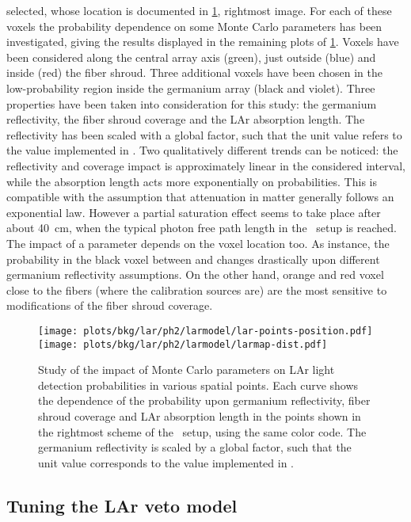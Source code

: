 selected, whose location is documented in \cref{fig:bkg:lar:ph2:larmap:dist}, rightmost
image. For each of these voxels the probability dependence on some Monte Carlo parameters
has been investigated, giving the results displayed in the remaining plots of
\cref{fig:bkg:lar:ph2:larmap:dist}. Voxels have been considered along the central array
axis (green), just outside (blue) and inside (red) the fiber shroud. Three additional
voxels have been chosen in the low-probability region inside the germanium array (black
and violet). Three properties have been taken into consideration for this study: the
germanium reflectivity, the fiber shroud coverage and the LAr absorption length. The
reflectivity has been scaled with a global factor, such that the unit value refers to the
value implemented in \mage. Two qualitatively different trends can be noticed: the
reflectivity and coverage impact is approximately linear in the considered interval, while
the absorption length acts more exponentially on probabilities. This is compatible with
the assumption that attenuation in matter generally follows an exponential law. However a
partial saturation effect seems to take place after about 40~cm, when the typical photon
free path length in the \gerda\ setup is reached. The impact of a parameter depends on the
voxel location too. As instance, the probability in the black voxel between  and
 changes drastically upon different germanium reflectivity assumptions. On the
other hand, orange and red voxel close to the fibers (where the calibration sources are)
are the most sensitive to modifications of the fiber shroud coverage.

\begin{figure}
  \centering
  \texttt{[image: plots/bkg/lar/ph2/larmodel/lar-points-position.pdf]}
  \texttt{[image: plots/bkg/lar/ph2/larmodel/larmap-dist.pdf]}
  \caption{%
    Study of the impact of Monte Carlo parameters on LAr light detection probabilities in
    various spatial points. Each curve shows the dependence of the probability upon
    germanium reflectivity, fiber shroud coverage and LAr absorption length in the points
    shown in the rightmost scheme of the \gerda\ setup, using the same color code. The
    germanium reflectivity is scaled by a global factor, such that the unit value
    corresponds to the value implemented in \mage.
  }\label{fig:bkg:lar:ph2:larmap:dist}
\end{figure}

\subsection{Tuning the LAr veto model}%
\label{sec:bkg:lar:ph2:pcalib}

